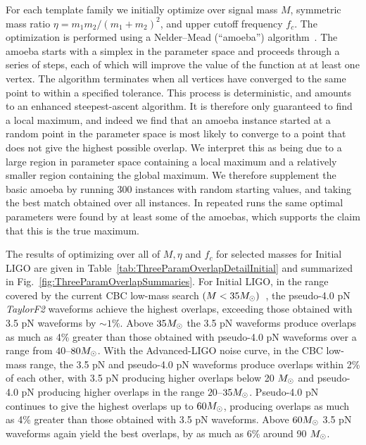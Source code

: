 For each template family we initially optimize over signal mass $M$,
symmetric mass ratio $\eta = m_1 m_2 / (m_1 + m_2)^2$, and upper
cutoff frequency $f_c$.  The optimization is performed using a
Nelder--Mead (``amoeba'') algorithm~\cite{numrec_cpp}.  The amoeba
starts with a simplex in the parameter space and proceeds through a
series of steps, each of which will improve the value of the function
at at least one vertex.  The algorithm terminates when all vertices
have converged to the same point to within a specified tolerance.
This process is deterministic, and amounts to an enhanced
steepest-ascent algorithm.  It is therefore only guaranteed to find a
local maximum, and indeed we find that an amoeba instance started at a
random point in the parameter space is most likely to converge to a
point that does not give the highest possible overlap.  We interpret
this as being due to a large region in parameter space containing a
local maximum and a relatively smaller region containing the global
maximum.  We therefore supplement the basic amoeba by running 300
instances with random starting values, and taking the best match
obtained over all instances.  In repeated runs the same optimal
parameters were found by at least some of the amoebas, which supports
the claim that this is the true maximum.

The results of optimizing over all of $M, \eta$ and $f_c$ for selected
masses for Initial LIGO are given in
Table~\ref{tab:ThreeParamOverlapDetailInitial} and summarized in
Fig.~\ref{fig:ThreeParamOverlapSummaries}.  For Initial LIGO, in the
range covered by the current CBC low-mass search $(M < 35
M_{\odot})$~\cite{Abbott:2008}, the pseudo-4.0 pN \textit{TaylorF2}
waveforms achieve the highest overlaps, exceeding those obtained with
3.5 pN waveforms by $\sim 1\%$.  Above $35 M_{\odot}$ the 3.5 pN waveforms
produce overlaps as much as 4\% greater than those obtained with
pseudo-4.0 pN waveforms over a range from $40$--$80 M_{\odot}$. With the
Advanced-LIGO noise curve, in the CBC low-mass range, the 3.5 pN and
pseudo-4.0 pN waveforms produce overlaps within 2\% of each other,
with 3.5 pN producing higher overlaps below 20 $M_{\odot}$ and pseudo-4.0
pN producing higher overlaps in the range $20$--$35 M_{\odot}$.
Pseudo-4.0 pN continues to give the highest overlaps up to $60 M_{\odot}$,
producing overlaps as much as 4\% greater than those obtained with 3.5
pN waveforms.  Above $60 M_{\odot}$ 3.5 pN waveforms again yield the best
overlaps, by as much as 6\% around 90 $M_{\odot}$.


